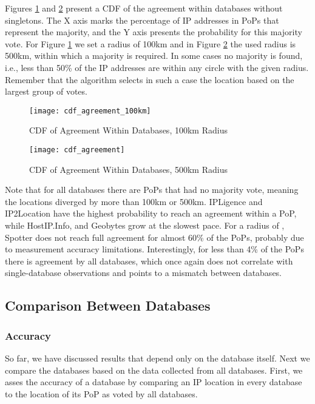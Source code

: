 Figures \ref{fig:cdf_agreement_100k} and \ref{fig:cdf_agreement}
present a CDF of the agreement within databases without singletons.
The X axis marks the percentage of IP addresses in PoPs that
represent the majority, and the Y axis presents the probability for
this majority vote. For Figure \ref{fig:cdf_agreement_100k} we set a
radius of 100km and in Figure \ref{fig:cdf_agreement} the used
radius is 500km, within which a majority is required. In some cases
no majority is found, i.e., less than 50\% of the IP addresses are
within any circle with the given radius. Remember that the algorithm
selects in such a case the location based on the largest group of
votes.

\begin{figure}
\begin{minipage}[b]{\linewidth}
\centering
\texttt{[image: cdf\_agreement\_100km]}
\caption{CDF of Agreement Within Databases, 100km Radius}
\label{fig:cdf_agreement_100k}
\end{minipage}
\end{figure}

\begin{figure}
\begin{minipage}[b]{\linewidth}
\centering
\texttt{[image: cdf\_agreement]}
\caption{CDF of Agreement Within Databases, 500km Radius}
\label{fig:cdf_agreement}
\end{minipage}
\end{figure}



Note that for all databases there are PoPs that had no majority
vote, meaning the locations diverged by more than 100km or 500km.
IPLigence and IP2Location have the highest probability to reach an
agreement within a PoP, while HostIP.Info, and Geobytes grow at the
slowest pace. For a radius of , Spotter does not reach full
agreement for almost 60\% of the PoPs, probably due to measurement
accuracy limitations. Interestingly, for less than 4\% of the PoPs
there is  agreement by all databases, which once again does
not correlate with single-database observations and points to a
mismatch between databases.



\subsection{Comparison Between Databases} \label{subsec:compare}
\subsubsection{Accuracy}
So far, we have discussed results that depend only on the database
itself. Next we compare the databases based on the data collected
from all databases. First, we asses the accuracy of a database by
comparing an IP location in every database to the location of its
PoP as voted by all databases.


